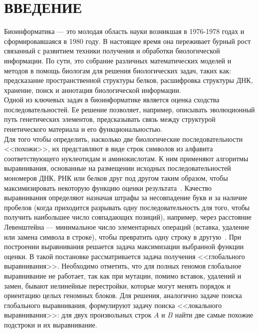\newpage
\part*{\large \centering ВВЕДЕНИЕ}
\hspace{\parindent} Биоинформатика --- это молодая область науки возникшая в 1976-1978 годах и сформировавшаяся в 1980 году. В настоящее время она переживает бурный рост связанный с развитием техники получения и обработки биологической информации. По сути, это собрание различных математических моделей и методов в помощь биологам для решения биологических задач, таких как: предсказание пространственной структуры белков, расшифровка структуры ДНК, хранение, поиск и аннотация биологической информации.\\
\indent Одной из ключевых задач в биоинформатике является оценка сходства последовательностей. Ее решение позволяет, например, описывать эволюционный путь генетических элементов, предсказывать связь между структурой генетического материала и его функциональностью.\\
\indent Для того чтобы определить, насколько две биологические последовательности <<похожи>>, их представляют в виде строк символов из алфавита соответствующего нуклеотидам и аминокислотам. К ним применяют алгоритмы выравнивания, основанные на размещении исходных последовательностей мономеров ДНК, РНК или белков друг под другом таким образом, чтобы максимизировать некоторую функцию оценки результата~\cite{WikiPairAlign}. Качество выравнивания определяют назначая штрафы за несовпадение букв и за наличие пробелов (когда приходится разрывать одну последовательность для того, чтобы получить наибольшее число совпадающих позиций), например, через расстояние Левенштейна --- минимальное число элементарных операций (вставка, удаление или замена символа в строке), чтобы превратить одну строку в другую~\cite{Levenshtein}. При построении выравнивания решается задача максимизации выбранной функции оценки. В такой постановке рассматривается задача получения <<глобального выравнивания>>. Необходимо отметить, что для полных геномов глобальное выравнивание не работает, так как при мутации, помимо вставок, удалений и замен, бывают нелинейные перестройки, которые могут менять порядок и ориентацию целых геномных блоков. Для решения, аналогично задаче поиска глобального выравнивания, формулируют задачу поиска <<локального выравнивания>>: для двух произвольных строк $A$ и $B$ найти две самые похожие подстроки и их выравнивание.\\ 
